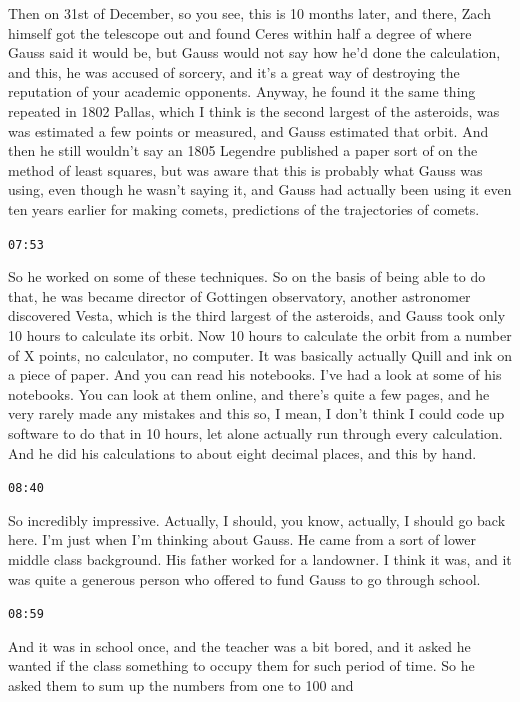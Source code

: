 \documentclass[11pt,a4paper]{article}
\newcommand{\timestamp}[1]{%
  \par\vspace{0.35em}%
  \noindent\colorbox{timestampback}{\textcolor{timestampblue}{\small\texttt{#1}}}%
  \par\vspace{0.2em}%
}
\begin{document}
Then on 31st of December, so you see, this is 10 months later, and there, Zach himself got the telescope out and found Ceres within half a degree of where Gauss said it would be, but Gauss would not say how he'd done the calculation, and this, he was accused of sorcery, and it's a great way of destroying the reputation of your academic opponents. Anyway, he found it the same thing repeated in 1802 Pallas, which I think is the second largest of the asteroids, was was estimated a few points or measured, and Gauss estimated that orbit. And then he still wouldn't say an 1805 Legendre published a paper sort of on the method of least squares, but was aware that this is probably what Gauss was using, even though he wasn't saying it, and Gauss had actually been using it even ten years earlier for making comets, predictions of the trajectories of comets.



\timestamp{07:53}

So he worked on some of these techniques. So on the basis of being able to do that, he was became director of Gottingen observatory, another astronomer discovered Vesta, which is the third largest of the asteroids, and Gauss took only 10 hours to calculate its orbit. Now 10 hours to calculate the orbit from a number of X points, no calculator, no computer. It was basically actually Quill and ink on a piece of paper. And you can read his notebooks. I've had a look at some of his notebooks. You can look at them online, and there's quite a few pages, and he very rarely made any mistakes and this so, I mean, I don't think I could code up software to do that in 10 hours, let alone actually run through every calculation. And he did his calculations to about eight decimal places, and this by hand.



\timestamp{08:40}

So incredibly impressive. Actually, I should, you know, actually, I should go back here. I'm just when I'm thinking about Gauss. He came from a sort of lower middle class background. His father worked for a landowner. I think it was, and it was quite a generous person who offered to fund Gauss to go through school.



\timestamp{08:59}

And it was in school once, and the teacher was a bit bored, and it asked he wanted if the class something to occupy them for such period of time. So he asked them to sum up the numbers from one to 100 and
\end{document}
